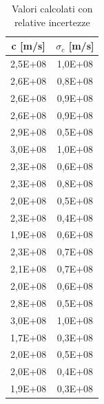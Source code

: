 \documentclass{article}
\begin{document}
            \begin{table}[H]

                \centering
                \begin{tabular}{c c} 
                    
                    \toprule
                    c [m/s] &  $\sigma_c$ [m/s] \\ 

                    \midrule
                    2,5E+08	&    1,0E+08 \\
                    2,6E+08	&    0,8E+08 \\
                    2,6E+08	&    0,9E+08 \\
                    2,6E+08	&    0,9E+08 \\
                    2,9E+08	&    0,5E+08 \\
                    3,0E+08	&    1,0E+08 \\
                    2,3E+08	&    0,6E+08 \\
                    2,3E+08	&    0,8E+08 \\
                    2,0E+08	&    0,5E+08 \\
                    2,3E+08	&    0,4E+08 \\
                    1,9E+08	&    0,6E+08 \\
                    2,3E+08	&    0,7E+08 \\
                    2,1E+08	&    0,7E+08 \\
                    2,0E+08	&    0,6E+08 \\
                    2,8E+08	&    0,5E+08 \\
                    3,0E+08	&    1,0E+08 \\
                    1,7E+08	&    0,3E+08 \\
                    2,0E+08	&    0,5E+08 \\
                    2,0E+08	&    0,4E+08 \\
                    1,9E+08	&    0,3E+08 \\
                    \bottomrule

                \end{tabular}
                
                \caption{Valori calcolati con relative incertezze}
                \label{tabular:dati c}

            \end{table}
            
\end{document}
